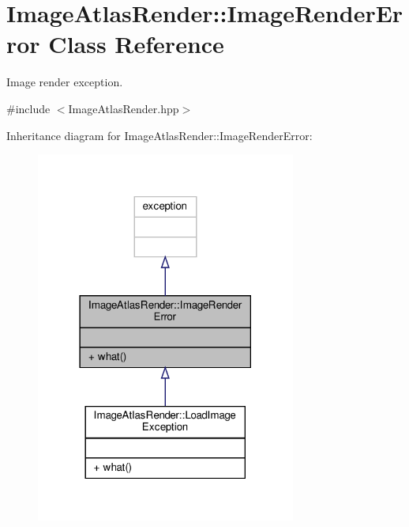 \hypertarget{class_image_atlas_render_1_1_image_render_error}{}\section{Image\+Atlas\+Render\+:\+:Image\+Render\+Error Class Reference}
\label{class_image_atlas_render_1_1_image_render_error}


Image render exception.  




{\ttfamily \#include $<$Image\+Atlas\+Render.\+hpp$>$}



Inheritance diagram for Image\+Atlas\+Render\+:\+:Image\+Render\+Error\+:
\nopagebreak
\begin{figure}[H]
\begin{center}
\leavevmode
\includegraphics[width=242pt]{class_image_atlas_render_1_1_image_render_error__inherit__graph}
\end{center}
\end{figure}


